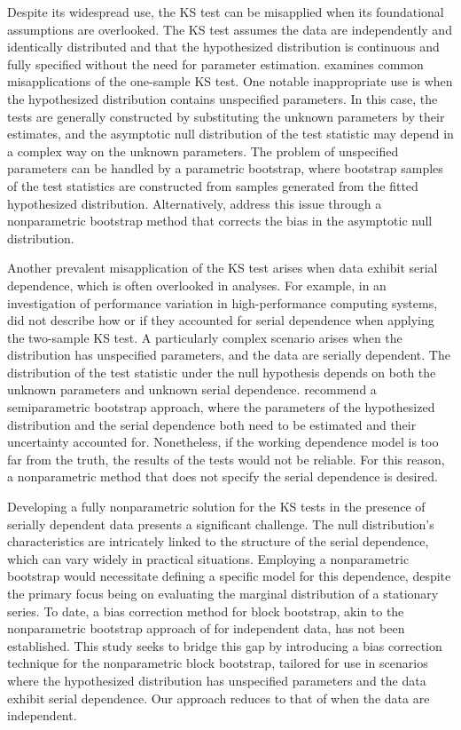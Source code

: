 \documentclass[APA,Times1COL]{WileyNJDv5} %
\begin{document}
Despite its widespread use, the KS test can be 
misapplied when its foundational assumptions are overlooked. The KS test 
assumes the data are independently and identically distributed and 
that the hypothesized distribution is continuous and fully specified without 
the need for parameter estimation. \citet{zeimbekakis2022misuses} examines
common misapplications of the one-sample KS test. One notable inappropriate
use is when the hypothesized distribution contains unspecified parameters.
In this case, the tests are generally constructed by substituting the unknown
parameters by their estimates, and the asymptotic null distribution of
the test statistic may depend in a complex way on the unknown parameters.
The problem of unspecified parameters can be handled by a parametric
bootstrap, where bootstrap samples of the test statistics are constructed from
samples generated from the fitted hypothesized distribution.
Alternatively, \citet{babu2004goodness} address this issue through a
nonparametric bootstrap method that corrects the bias in the asymptotic null
distribution.



Another prevalent misapplication of the KS test arises when data exhibit serial
dependence, which is often overlooked in analyses. For example, in an
investigation of performance variation in high-performance computing systems,
\citet{tuncer2019ieee} did not describe how or if they accounted for serial
dependence when applying the two-sample KS test.
A particularly complex scenario arises when the distribution has unspecified
parameters, and the data are serially dependent.
The distribution of the test statistic under the null hypothesis depends on both
the unknown parameters and unknown serial dependence. 
\citet{zeimbekakis2022misuses} recommend a semiparametric bootstrap
approach, where the parameters of the hypothesized distribution and the serial
dependence both need to be estimated and their uncertainty accounted for.
Nonetheless, if the working dependence model is too far from the truth, the
results of the tests would not be reliable. For this reason, a nonparametric
method that does not specify the serial dependence is desired.


Developing a fully nonparametric solution for the KS 
tests in the presence of serially dependent data presents a significant 
challenge. The null distribution's characteristics are intricately linked to 
the structure of the serial dependence, which can vary widely in practical 
situations. Employing a nonparametric bootstrap would necessitate defining a 
specific model for this dependence, despite the primary focus being on 
evaluating the marginal distribution of a stationary series. To date, a bias 
correction method for block bootstrap, akin to the nonparametric bootstrap
approach of \citet{babu2004goodness} for independent data,
has not been established. This study seeks 
to bridge this gap by introducing a bias correction technique for the 
nonparametric block bootstrap, tailored for use in scenarios where the 
hypothesized distribution has unspecified parameters and the data 
exhibit serial dependence. Our approach reduces to that of
\citet{babu2004goodness} when the data are independent.
\end{document}
